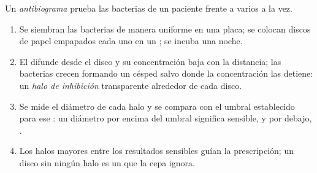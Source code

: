 \begin{method}\label{met:g11:antibiotic-resistance:antibiogram}
Un \emph{antibiograma} prueba las bacterias de un paciente frente a
varios  a la vez.
\begin{enumerate}
  \item Se siembran las bacterias de manera uniforme en una placa; se
        colocan discos de papel empapados cada uno en un ;
        se incuba una noche.
  \item El  difunde desde el disco y su concentración baja
        con la distancia; las bacterias crecen formando un césped
        salvo donde la concentración las detiene: un \emph{halo de
        inhibición} transparente alrededor de cada disco.
  \item Se mide el diámetro de cada halo y se compara con el umbral
        establecido para ese : un diámetro por encima del
        umbral significa sensible, y por debajo, .
  \item Los halos mayores entre los resultados sensibles guían la
        prescripción; un disco sin ningún halo es un  que la
        cepa ignora.
\end{enumerate}
\end{method}

